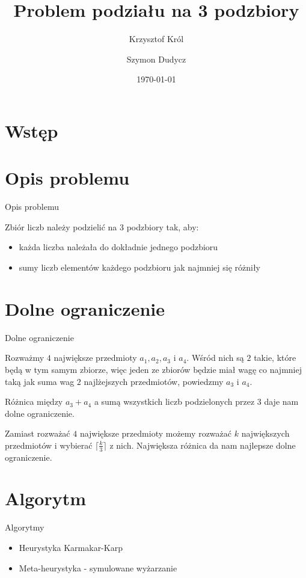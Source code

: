 \documentclass{beamer}
\title{Problem podziału na 3 podzbiory}
\author{
       Krzysztof Król\and
                Szymon Dudycz
}
\date{\today}
\begin{document}
\section{Wstęp}
\begin{frame}
  \titlepage
\end{frame}


\section{Opis problemu}

\begin{frame}{Opis problemu}

Zbiór liczb należy podzielić na 3 podzbiory tak, aby:
\begin{itemize}  
\item każda liczba należała do dokładnie jednego podzbioru
\item sumy liczb elementów każdego podzbioru jak najmniej się różniły
\end{itemize}


\end{frame}  


\section{Dolne ograniczenie}

\begin{frame}[t]{Dolne ograniczenie}

Rozważmy $4$ największe przedmioty $a_1, a_2, a_3$ i $a_4$. Wśród nich są $2$ takie, które będą w tym samym zbiorze, więc jeden ze zbiorów będzie miał wagę co najmniej taką jak suma wag $2$ najlżejszych przedmiotów, powiedzmy $a_3$ i $a_4$.

Różnica między $a_3+a_4$ a sumą wszystkich liczb podzielonych przez $3$ daje nam dolne ograniczenie.

\pause

Zamiast rozważać $4$ największe przedmioty możemy rozważać $k$ największych przedmiotów i wybierać $\lceil \frac{k}{3} \rceil$ z nich. Największa różnica da nam najlepsze dolne ograniczenie.

\end{frame}

\section{Algorytm}

\begin{frame}{Algorytmy}


\begin{itemize}
\item Heurystyka Karmakar-Karp
\item Meta-heurystyka - symulowane wyżarzanie
\end{itemize}

\end{frame}
\end{document}
